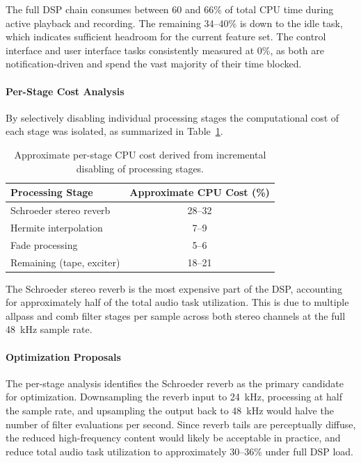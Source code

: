 The full DSP chain consumes between 60 and 66\% of total CPU time during active 
playback and recording. 
The remaining 34--40\% is down to the idle task, which indicates sufficient headroom for the current feature set. 
The control interface and user interface tasks consistently measured at 0\%, as both are notification-driven and spend the vast majority of their time blocked.

\paragraph{Per-Stage Cost Analysis}

By selectively disabling individual processing stages the computational cost of 
each stage was isolated, as summarized in Table~\ref{tab:stage_cost}.

\begin{table}[H]
	\centering
	\begin{tabular}{lc}
		\toprule
		\textbf{Processing Stage} & \textbf{Approximate CPU Cost (\%)} \\
		\midrule
		Schroeder stereo reverb      & 28--32 \\
		Hermite interpolation        & 7--9   \\
		Fade processing              & 5--6   \\
		Remaining (tape, exciter)    & 18--21 \\
		\bottomrule
	\end{tabular}
	\caption{Approximate per-stage CPU cost derived from incremental disabling 
		of processing stages.}
	\label{tab:stage_cost}
\end{table}

The Schroeder stereo reverb is the most expensive part of the DSP, accounting for approximately half of the total audio task utilization. 
This is due to multiple allpass and comb filter stages per sample across both stereo channels at the full 48~kHz sample rate.

\paragraph{Optimization Proposals}

The per-stage analysis identifies the Schroeder reverb as the primary candidate for optimization. 
Downsampling the reverb input to 24~kHz, processing at half the sample rate, and upsampling the output back to 48~kHz would halve the number of filter evaluations per second. 
Since reverb tails are perceptually diffuse, the reduced high-frequency content would likely be acceptable in practice, and reduce total audio task utilization to approximately 30--36\% under full DSP load.

